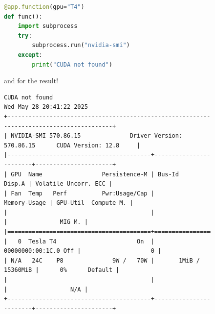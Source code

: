 \documentclass[12pt]{article}
\begin{document}
\begin{figure}[!htb]
\begin{minipage}[t]{0.65\textwidth}
\begin{lstlisting}[language=python,style=python,basicstyle=\ttfamily\footnotesize]
@app.function(gpu="T4")
def func():
    import subprocess
    try:
        subprocess.run("nvidia-smi")
    except:
        print("CUDA not found")
    \end{lstlisting}
and for the result!
\vspace{-0.9em}
\begin{tiny}
{\color{CornflowerBlue}\begin{verbatim}
CUDA not found
Wed May 28 20:41:22 2025       
+-----------------------------------------------------------------------------------------+
| NVIDIA-SMI 570.86.15              Driver Version: 570.86.15      CUDA Version: 12.8     |
|-----------------------------------------+------------------------+----------------------+
| GPU  Name                 Persistence-M | Bus-Id          Disp.A | Volatile Uncorr. ECC |
| Fan  Temp   Perf          Pwr:Usage/Cap |           Memory-Usage | GPU-Util  Compute M. |
|                                         |                        |               MIG M. |
|=========================================+========================+======================|
|   0  Tesla T4                       On  |   00000000:00:1C.0 Off |                    0 |
| N/A   24C    P8              9W /   70W |       1MiB /  15360MiB |      0%      Default |
|                                         |                        |                  N/A |
+-----------------------------------------+------------------------+----------------------+
                                                                                         

\end{verbatim}}
\end{tiny}
\end{minipage}
\end{figure}
\end{document}
